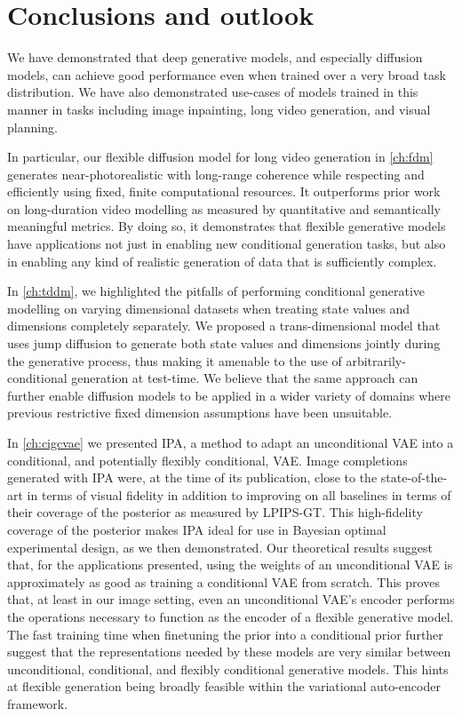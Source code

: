 \chapter{Conclusions and outlook}  \label{ch:conclusion}

We have demonstrated that deep generative models, and especially diffusion models, can achieve good performance even when trained over a very broad task distribution. We have also demonstrated use-cases of models trained in this manner in tasks including image inpainting, long video generation, and visual planning. 

In particular, our flexible diffusion model for long video generation in \cref{ch:fdm} generates near-photorealistic with long-range coherence while respecting and efficiently using fixed, finite computational resources. It outperforms prior work on long-duration video modelling as measured by quantitative and semantically meaningful metrics. By doing so, it demonstrates that flexible generative models have applications not just in enabling new conditional generation tasks, but also in enabling any kind of realistic generation of data that is sufficiently complex. 

In \cref{ch:tddm}, we highlighted the pitfalls of performing conditional generative modelling on varying dimensional datasets when treating state values and dimensions completely separately. We proposed a trans-dimensional model that uses jump diffusion to generate both state values and dimensions jointly during the generative process, thus making it amenable to the use of arbitrarily-conditional generation at test-time.  We believe that the same approach can further enable diffusion models to be applied in a wider variety of domains where previous restrictive fixed dimension assumptions have been unsuitable.

In \cref{ch:cigcvae} we presented IPA, a method to adapt an unconditional VAE into a conditional, and potentially flexibly conditional, VAE. Image completions generated with IPA were, at the time of its publication, close to the state-of-the-art in terms of visual fidelity in addition to improving on all baselines in terms of their coverage of the posterior as measured by LPIPS-GT. This high-fidelity coverage of the posterior makes IPA ideal for use in Bayesian optimal experimental design, as we then demonstrated. Our theoretical results suggest that, for the applications presented, using the weights of an unconditional VAE is approximately as good as training a conditional VAE from scratch. This proves that, at least in our image setting, even an unconditional VAE's encoder performs the operations necessary to function as the encoder of a flexible generative model. The fast training time when finetuning the prior into a conditional prior further suggest that the representations needed by these models are very similar between unconditional, conditional, and flexibly conditional generative models. This hints at flexible generation being broadly feasible within the variational auto-encoder framework.

